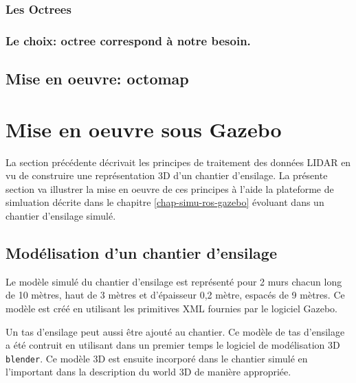\documentclass[12pt,a4paper]{report}
\begin{document}
		\subsubsection{Les Octrees}
		
		\subsubsection{Le choix: octree correspond à notre besoin.}
		
		\subsection{Mise en oeuvre: octomap}
		
	\section{Mise en oeuvre sous Gazebo}
	
	La section précédente décrivait les principes de traitement des données LIDAR en vu de construire une représentation 3D d'un chantier d'ensilage. La présente section va illustrer la mise en oeuvre de ces principes à l'aide la plateforme de simluation décrite dans le chapitre \ref{chap-simu-ros-gazebo} évoluant dans un chantier d'ensilage simulé.
	
		\subsection{Modélisation d'un chantier d'ensilage}
		Le modèle simulé du chantier d'ensilage est représenté pour 2 murs chacun long de 10 mètres, haut de 3 mètres et d'épaisseur 0,2 mètre, espacés de 9 mètres. Ce modèle est créé en utilisant les primitives XML fournies par le logiciel Gazebo.
		
		
		\para Un tas d'ensilage peut aussi être ajouté au chantier. Ce modèle de tas d'ensilage a été contruit en utilisant dans un premier temps le logiciel de modélisation 3D \verb|blender|. Ce modèle 3D est ensuite incorporé dans le chantier simulé en l'important dans la description du world 3D de manière appropriée.
		
\end{document}
